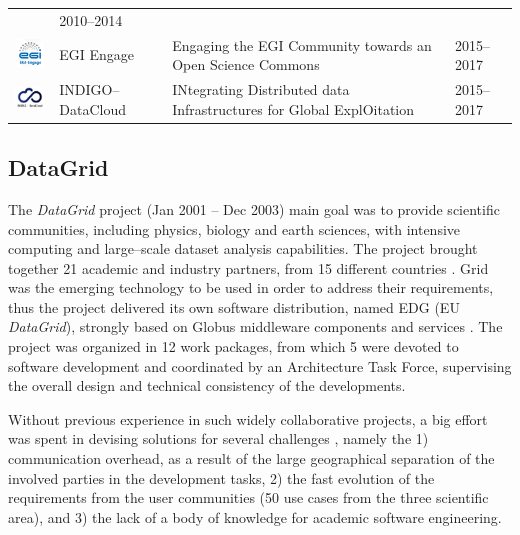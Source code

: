 \documentclass[journal]{IEEEtran}
\begin{document}
\begin{table}[!h]
\begin{tabular}{p{1.6cm}p{1.5cm}p{3cm}l}
 & 2010--2014\\
\begin{minipage}{.3\textwidth}
\includegraphics[width=15mm,height=7.5mm]{images/egi_engage}
\end{minipage}
     & EGI Engage &
Engaging the EGI Community towards an Open Science Commons
 & 2015--2017\\
\begin{minipage}{.3\textwidth}
\includegraphics[width=15mm,height=7.5mm]{images/indigo}
\end{minipage}
     & INDIGO--DataCloud &
INtegrating Distributed data Infrastructures for Global ExplOitation
 & 2015--2017\\
\hline
\hline
\end{tabular}
\end{table}

\subsection{DataGrid}

The {\sl DataGrid} \cite{cordis:datagrid} project (Jan 2001 -- Dec 2003)
main goal was to provide scientific communities, including physics, biology and
earth sciences, with intensive computing and large--scale dataset analysis capabilities.
The project brought together 21 academic and industry partners, from 15 different countries \cite{gagliardi}.
Grid was the emerging technology to be used in order to address their requirements,
thus the project delivered its own software distribution, named EDG (EU {\sl DataGrid}), strongly
based on Globus middleware components and services \cite{globus}. The project was organized in 12 work packages, from
which 5 were devoted to software development and coordinated by an
Architecture Task Force, supervising the overall design and technical consistency
of the developments.

Without previous experience in such widely
collaborative projects, a big effort was spent in devising solutions for several
challenges \cite{datagrid}, namely the 1) communication overhead, as a
result of the large geographical separation of the involved parties in the
development tasks, 2) the fast evolution of the requirements from the user
communities (50 use cases from the three scientific area), and 3) the lack of a body
of knowledge for academic software engineering.
\end{document}
